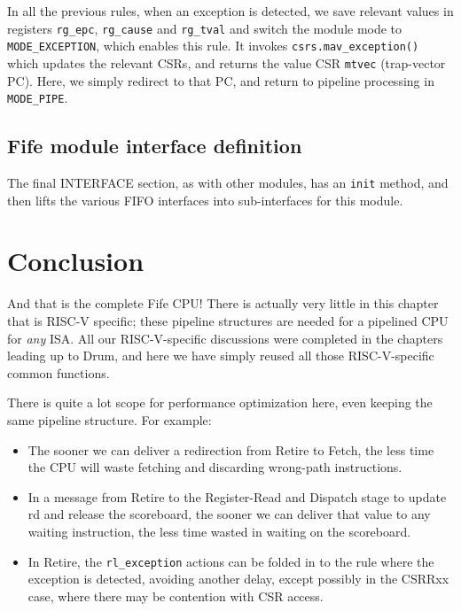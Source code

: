 In all the previous rules, when an exception is detected, we save
relevant values in registers \verb|rg_epc|, \verb|rg_cause| and
\verb|rg_tval| and switch the module mode to \verb|MODE_EXCEPTION|,
which enables this rule.  It invokes \verb|csrs.mav_exception()| which
updates the relevant CSRs, and returns the value CSR \verb|mtvec|
(trap-vector PC).  Here, we simply redirect to that PC, and return to
pipeline processing in \verb|MODE_PIPE|.


\subsection{Fife module interface definition}

The final INTERFACE section, as with other modules, has an \verb|init|
method, and then lifts the various FIFO interfaces into sub-interfaces
for this module.



\section{Conclusion}

And that is the complete Fife CPU!  There is actually very little in
this chapter that is RISC-V specific; these pipeline structures are
needed for a pipelined CPU for \emph{any} ISA.  All our
RISC-V-specific discussions were completed in the chapters leading up
to Drum, and here we have simply reused all those RISC-V-specific
common functions.

There is quite a lot scope for performance optimization here, even
keeping the same pipeline structure.  For example:

\begin{itemize}

\item The sooner we can deliver a redirection from Retire to Fetch,
      the less time the CPU will waste fetching and discarding
      wrong-path instructions.

\item In a message from Retire to the Register-Read and Dispatch stage
      to update rd and release the scoreboard, the sooner we can
      deliver that value to any waiting instruction, the less time
      wasted in waiting on the scoreboard.

\item In Retire, the \verb|rl_exception| actions can be folded in to
      the rule where the exception is detected, avoiding another
      delay, except possibly in the CSRRxx case, where there may be
      contention with CSR access.

\end{itemize}


